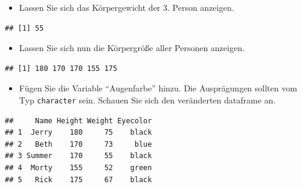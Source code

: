\documentclass[12pt,a4paper]{article}
\newenvironment{Shaded}{\begin{snugshade}}{\end{snugshade}}
\newcommand{\DecValTok}[1]{\textcolor[rgb]{0.00,0.00,0.81}{#1}}
\newcommand{\FunctionTok}[1]{\textcolor[rgb]{0.13,0.29,0.53}{\textbf{#1}}}
\newcommand{\NormalTok}[1]{#1}
\newcommand{\OtherTok}[1]{\textcolor[rgb]{0.56,0.35,0.01}{#1}}
\newcommand{\SpecialCharTok}[1]{\textcolor[rgb]{0.81,0.36,0.00}{\textbf{#1}}}
\newcommand{\StringTok}[1]{\textcolor[rgb]{0.31,0.60,0.02}{#1}}
\begin{document}
\begin{itemize}
  \item Lassen Sie sich das Körpergewicht der 3. Person anzeigen.
\end{itemize}

\begin{Shaded}
\end{Shaded}

\begin{verbatim}
## [1] 55
\end{verbatim}

\begin{itemize}
  \item Lassen Sie sich nun die Körpergröße aller Personen anzeigen.
\end{itemize}

\begin{Shaded}
\end{Shaded}

\begin{verbatim}
## [1] 180 170 170 155 175
\end{verbatim}

\begin{itemize}
  \item Fügen Sie die Variable “Augenfarbe” hinzu. Die Ausprägungen sollten vom Typ \texttt{character} sein. Schauen Sie sich den veränderten dataframe an.
\end{itemize}

\begin{Shaded}
\end{Shaded}

\begin{verbatim}
##     Name Height Weight Eyecolor
## 1  Jerry    180     75    black
## 2   Beth    170     73     blue
## 3 Summer    170     55    black
## 4  Morty    155     52    green
## 5   Rick    175     67    black
\end{verbatim}
\end{document}
